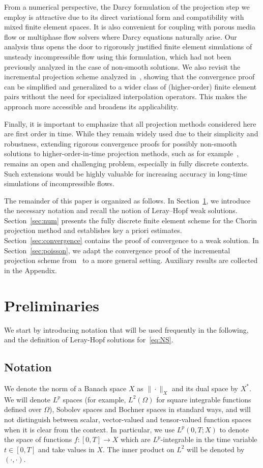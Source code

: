 \documentclass[10pt,letterpaper]{amsart}
\newcommand{\dom}{\Omega}
\theoremstyle{definition}{\newtheorem{definition}[lemma]{Definition}}
\numberwithin{equation}{section}
\begin{document}
	From a numerical perspective, the Darcy formulation of the projection step we employ is attractive due to its direct variational form and compatibility with mixed finite element spaces. It is also convenient for coupling with porous media flow or multiphase flow solvers where Darcy equations naturally arise. Our analysis thus opens the door to rigorously justified finite element simulations of unsteady incompressible flow using this formulation, which had not been previously analyzed in the case of non-smooth solutions.
	We also revisit the incremental projection scheme analyzed in~\cite{Eymard2024}, showing that the convergence proof can be simplified and generalized to a wider class of (higher-order) finite element pairs without the need for specialized interpolation operators. This makes the approach more accessible and broadens its applicability. 
	
	Finally, it is important to emphasize that all projection methods considered here are first order in time. While they remain widely used due to their simplicity and robustness, extending rigorous convergence proofs for possibly non-smooth solutions to higher-order-in-time projection methods, such as for example~\cite{Bell1989}, remains an open and challenging problem, especially in fully discrete contexts. Such extensions would be highly valuable for increasing accuracy in long-time simulations of incompressible flows.
	
	The remainder of this paper is organized as follows. In Section~\ref{sec:prelim}, we introduce the necessary notation and recall the notion of Leray–Hopf weak solutions. Section~\ref{sec:num} presents the fully discrete finite element scheme for the Chorin projection method and establishes key a priori estimates. Section~\ref{sec:convergence} contains the proof of convergence to a weak solution. %
	In Section~\ref{sec:poisson}, we adapt the convergence proof of the incremental projection scheme from~\cite{Eymard2024} to a more general setting. Auxiliary results are collected in the Appendix.
	
\section{Preliminaries}\label{sec:prelim}
We start by introducing notation that will be used frequently in the following, and the definition of Leray-Hopf solutions for~\eqref{eq:NS}.

\subsection{Notation}
We denote the norm of a Banach space $X$ as $\|\cdot\|_X$ and its dual space by $X^*$.  We will denote $L^p$ spaces (for example, $L^2(\dom)$ for square integrable functions defined over $\dom$), Sobolev spaces and Bochner spaces in standard ways, and will not distinguish between scalar, vector-valued and tensor-valued function spaces when it is clear from the context. In particular, we use $L^p(0,T; X)$ to denote the space of functions $f:[0,T]\to X$ which are $L^p$-integrable in the time variable $t\in [0,T]$ and take values in   $X$.  The inner product on $L^2$ will be denoted by $(\cdot, \cdot)$.
\end{document}
